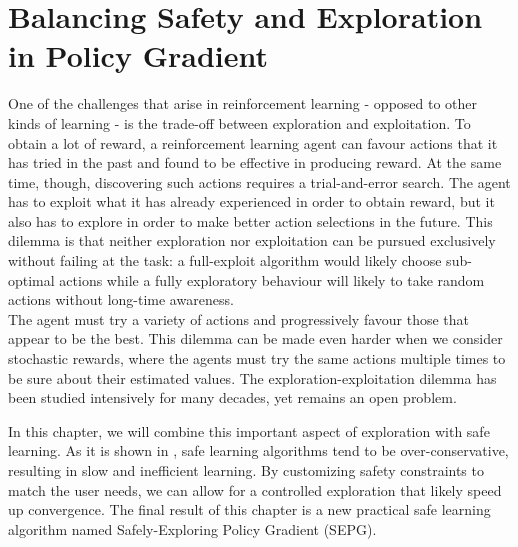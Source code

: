 \chapter{Balancing Safety and Exploration in Policy Gradient}
\label{ch:balance}
\thispagestyle{empty}

\fancyhead[LE,RO]{\bfseries\thepage}                               
\fancyhead[LO]{\bfseries\rightmark}  


One of the challenges that arise in reinforcement learning - opposed to other kinds of learning - is the trade-off between exploration and exploitation. To obtain a lot of reward, a reinforcement learning agent can favour actions that it has tried in the past and found to be effective in producing reward. At the same time, though, discovering such actions requires a trial-and-error search. The agent has to exploit what it has already experienced in order to obtain reward, but it also has to explore in order to make better action selections in the future. This dilemma is that neither exploration nor exploitation can be pursued exclusively without failing at the task: a full-exploit algorithm would likely choose sub-optimal actions while a fully exploratory behaviour will likely to take random actions without long-time awareness.\\
The agent must try a variety of actions and progressively favour those that appear to be the best. This dilemma can be made even harder when we consider stochastic rewards, where the agents must try the same actions multiple times to be sure about their estimated values. The exploration-exploitation dilemma has been studied intensively for many decades, yet remains an open problem. 

In this chapter, we will combine this important aspect of exploration with safe learning. As it is shown in , safe learning algorithms tend to be over-conservative, resulting in slow and inefficient learning. By customizing safety constraints to match the user needs, we can allow for a controlled exploration that likely speed up convergence. The final result of this chapter is a new practical safe learning algorithm named Safely-Exploring Policy Gradient (SEPG). 

